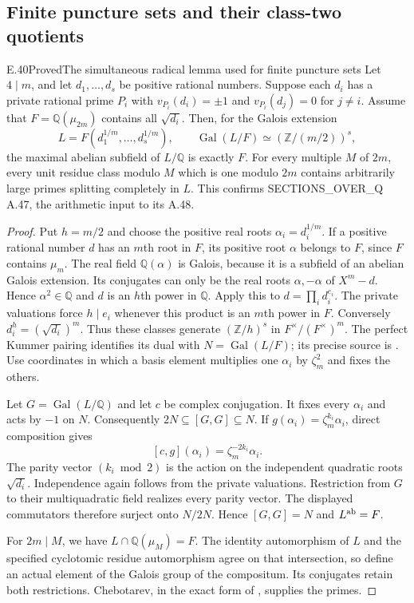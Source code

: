 \subsection{Finite puncture sets and their class-two quotients}

\begin{result}{E.40}{Proved}{The simultaneous radical lemma used for finite puncture sets}
Let $4\mid m$, and let $d_1,\ldots,d_s$ be positive rational numbers.
Suppose each $d_i$ has a private rational prime $P_i$ with
$v_{P_i}(d_i)=\pm1$ and $v_{P_i}(d_j)=0$ for $j\ne i$.
Assume that $F=\mathbb Q(\mu_{2m})$ contains all $\sqrt{d_i}$.
Then, for the Galois extension
\[
 L=F(d_1^{1/m},\ldots,d_s^{1/m}),
 \qquad \operatorname{Gal}(L/F)\simeq(\mathbb Z/(m/2))^s,
\]
the maximal abelian subfield of $L/\mathbb Q$ is exactly $F$.
For every multiple $M$ of $2m$, every unit residue class modulo $M$
which is one modulo $2m$ contains arbitrarily large primes splitting
completely in $L$. This confirms SECTIONS\_OVER\_Q A.47, the
arithmetic input to its A.48.
\end{result}
\begin{proof}
Put $h=m/2$ and choose the positive real roots $\alpha_i=d_i^{1/m}$.
If a positive rational number $d$ has an $m$th root in $F$, its
positive root $\alpha$ belongs to $F$, since $F$ contains $\mu_m$.
The real field $\mathbb Q(\alpha)$ is Galois, because it is a
subfield of an abelian Galois extension. Its conjugates can only be
the real roots $\alpha,-\alpha$ of $X^m-d$. Hence
$\alpha^2\in\mathbb Q$ and $d$ is an $h$th power in $\mathbb Q$.
Apply this to $d=\prod_i d_i^{e_i}$. The private valuations force
$h\mid e_i$ whenever this product is an $m$th power in $F$.
Conversely $d_i^h=(\sqrt{d_i})^m$. Thus these classes generate
$(\mathbb Z/h)^s$ in $F^\times/(F^\times)^m$.
The perfect Kummer pairing identifies its dual with
$N=\operatorname{Gal}(L/F)$; its precise source is
\citet[Theorem 5.30 and Remark 5.32, pp.~75--76]{RootMilneFT}.
Use coordinates in which a basis element multiplies one $\alpha_i$
by $\zeta_m^2$ and fixes the others.

Let $G=\operatorname{Gal}(L/\mathbb Q)$ and let $c$ be complex
conjugation. It fixes every $\alpha_i$ and acts by $-1$ on $N$.
Consequently $2N\subseteq[G,G]\subseteq N$. If
$g(\alpha_i)=\zeta_m^{k_i}\alpha_i$, direct composition gives
\[
 [c,g](\alpha_i)=\zeta_m^{-2k_i}\alpha_i.
\]
The parity vector $(k_i\bmod2)$ is the action on the independent
quadratic roots $\sqrt{d_i}$. Independence again follows from the
private valuations. Restriction from $G$ to their multiquadratic
field realizes every parity vector. The displayed commutators
therefore surject onto $N/2N$. Hence $[G,G]=N$ and $L^{\rm ab}=F$.

For $2m\mid M$, we have $L\cap\mathbb Q(\mu_M)=F$.
The identity automorphism of $L$ and the specified cyclotomic
residue automorphism agree on that intersection, so define an
actual element of the Galois group of the compositum. Its conjugates
retain both restrictions. Chebotarev, in the exact form of
\citet[Theorem 8.31, p.~147]{CohMilneANT}, supplies the primes.
\end{proof}

